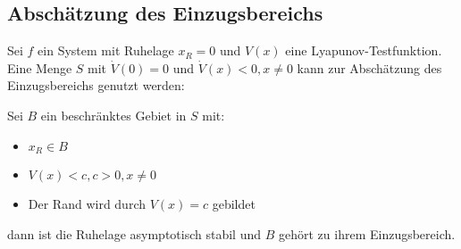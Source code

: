 \subsection{Abschätzung des Einzugsbereichs}
Sei $f$ ein System mit Ruhelage $x_R=0$ und $V(x)$ eine Lyapunov-Testfunktion. Eine
Menge $S$ mit $\dot{V}(0) = 0$ und $\dot{V}(x) < 0, x \neq 0$ kann zur Abschätzung des
Einzugsbereichs genutzt werden:

Sei $B$ ein beschränktes Gebiet in $S$ mit:
\begin{itemize}
    \item $x_R \in B$
    \item $V(x) < c, c>0, x \neq 0$
    \item Der Rand wird durch $V(x)=c$ gebildet
\end{itemize}
dann ist die Ruhelage asymptotisch stabil und $B$ gehört zu ihrem Einzugsbereich.

